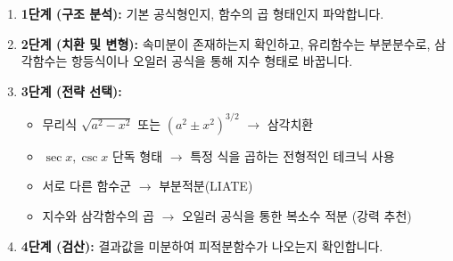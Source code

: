 \documentclass[12pt, a4paper]{article}
\begin{document}
\begin{enumerate}
    \item \textbf{1단계 (구조 분석):} 기본 공식형인지, 함수의 곱 형태인지 파악합니다.
    \item \textbf{2단계 (치환 및 변형):} 속미분이 존재하는지 확인하고, 유리함수는 부분분수로, 삼각함수는 항등식이나 오일러 공식을 통해 지수 형태로 바꿉니다.
    \item \textbf{3단계 (전략 선택):}
    \begin{itemize}
        \item 무리식 $\sqrt{a^2-x^2}$ 또는 $(a^2 \pm x^2)^{3/2}$ $\rightarrow$ 삼각치환
        \item $\sec x, \csc x$ 단독 형태 $\rightarrow$ 특정 식을 곱하는 전형적인 테크닉 사용
        \item 서로 다른 함수군 $\rightarrow$ 부분적분(LIATE)
        \item 지수와 삼각함수의 곱 $\rightarrow$ 오일러 공식을 통한 복소수 적분 (강력 추천)
    \end{itemize}
    \item \textbf{4단계 (검산):} 결과값을 미분하여 피적분함수가 나오는지 확인합니다.
\end{enumerate}
\end{document}
